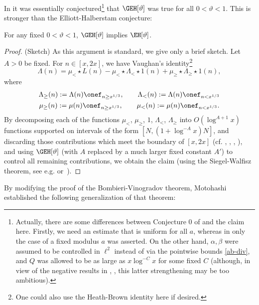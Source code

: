 In \cite[Conjecture 0]{bfi} it was essentially conjectured\footnote{Actually, there are some differences between Conjecture 0 of \cite{bfi} and the claim here.  Firstly, we need an estimate that is uniform for all $a$, whereas in \cite{bfi} only the case of a fixed modulus $a$ was asserted.  On the other hand, $\alpha,\beta$ were assumed to be controlled in $\ell^2$ instead of via the pointwise bounds \eqref{ab-div}, and $Q$ was allowed to be as large as $x \log^{-C} x$ for some fixed $C$ (although, in view of the negative results in \cite{fg}, \cite{fghm}, this latter strengthening may be too ambitious).} that $\GEH[\vartheta]$ was true for all $0 < \vartheta < 1$.   This is stronger than the Elliott-Halberstam conjecture:

\begin{proposition}\label{geh-eh}  For any fixed $0 < \vartheta < 1$, $\GEH[\vartheta]$ implies $\EH[\vartheta]$.
\end{proposition}

\begin{proof} (Sketch)  As this argument is standard, we give only a brief sketch.
Let $A > 0$ be fixed.  For $n \in [x,2x]$, we have Vaughan's identity\footnote{One could also use the Heath-Brown identity \cite{hb-ident} here if desired.} \cite{vaughan}
$$ \Lambda(n) = \mu_< \star  L(n) - \mu_< \star  \Lambda_< \star  1(n) + \mu_\geq \star  \Lambda_\geq \star  1(n),$$
where
\begin{gather}
\Lambda_\geq(n) := \Lambda(n) \onef_{n \geq x^{1/3}},\quad\quad 
\Lambda_<(n) := \Lambda(n) \onef_{n < x^{1/3}}\\
\mu_\geq(n) := \mu(n) \onef_{n \geq x^{1/3}},\quad\quad \mu_<(n) := \mu(n)
\onef_{n < x^{1/3}}.
\end{gather}
By decomposing each of the functions $\mu_<$, $\mu_\geq$, $1$, $\Lambda_<$, $\Lambda_{\geq}$ into $O(\log^{A+1} x)$ functions supported on intervals of the form $[N, (1+\log^{-A} x) N]$, and discarding those contributions which meet the boundary of $[x,2x]$ (cf. \cite{fouvry}, \cite{fi-2}, \cite{bfi}, \cite{zhang}), and using $\GEH[\vartheta]$ (with $A$ replaced by a much larger fixed constant $A'$) to control all remaining contributions, we obtain the claim (using the Siegel-Walfisz theorem, see e.g. \cite[Satz 4]{siebert}
  or~\cite[Th. 5.29]{ik}).
\end{proof}

By modifying the proof of the Bombieri-Vinogradov theorem, Motohashi \cite{motohashi} established the following generalization of that theorem:

